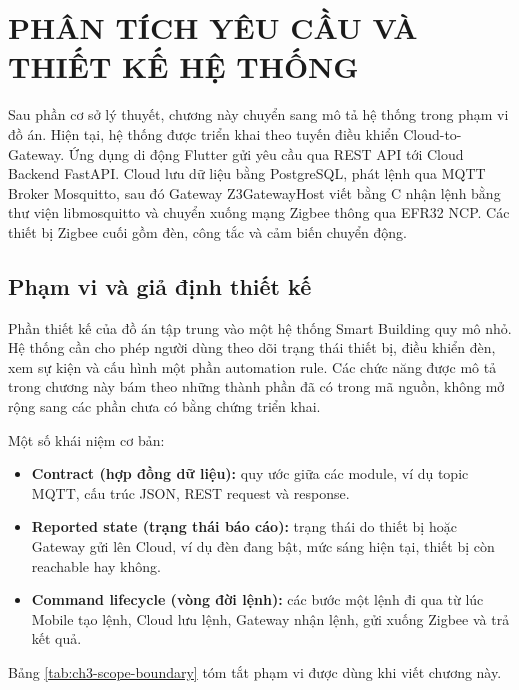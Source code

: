 \chapter{PHÂN TÍCH YÊU CẦU VÀ THIẾT KẾ HỆ THỐNG}
\label{ch:thietke}

Sau phần cơ sở lý thuyết, chương này chuyển sang mô tả hệ thống trong phạm vi đồ án. 
Hiện tại, hệ thống được triển khai theo tuyến điều khiển Cloud-to-Gateway. Ứng dụng di động Flutter gửi yêu cầu qua REST API tới Cloud Backend FastAPI. Cloud lưu dữ liệu bằng PostgreSQL, phát lệnh qua MQTT Broker Mosquitto, sau đó Gateway Z3GatewayHost viết bằng C nhận lệnh bằng thư viện libmosquitto và chuyển xuống mạng Zigbee thông qua EFR32 NCP. Các thiết bị Zigbee cuối gồm đèn, công tắc và cảm biến chuyển động.

\section{Phạm vi và giả định thiết kế}
\label{sec:ch3-scope}

Phần thiết kế của đồ án tập trung vào một hệ thống Smart Building quy mô nhỏ. Hệ thống cần cho phép người dùng theo dõi trạng thái thiết bị, điều khiển đèn, xem sự kiện và cấu hình một phần automation rule. Các chức năng được mô tả trong chương này bám theo những thành phần đã có trong mã nguồn, không mở rộng sang các phần chưa có bằng chứng triển khai.

Một số khái niệm cơ bản:

\begin{itemize}[leftmargin=1.2cm]
    \item \textbf{Contract (hợp đồng dữ liệu):} quy ước giữa các module, ví dụ topic MQTT, cấu trúc JSON, REST request và response.
    \item \textbf{Reported state (trạng thái báo cáo):} trạng thái do thiết bị hoặc Gateway gửi lên Cloud, ví dụ đèn đang bật, mức sáng hiện tại, thiết bị còn reachable hay không.
    \item \textbf{Command lifecycle (vòng đời lệnh):} các bước một lệnh đi qua từ lúc Mobile tạo lệnh, Cloud lưu lệnh, Gateway nhận lệnh, gửi xuống Zigbee và trả kết quả.
\end{itemize}

Bảng \ref{tab:ch3-scope-boundary} tóm tắt phạm vi được dùng khi viết chương này.

